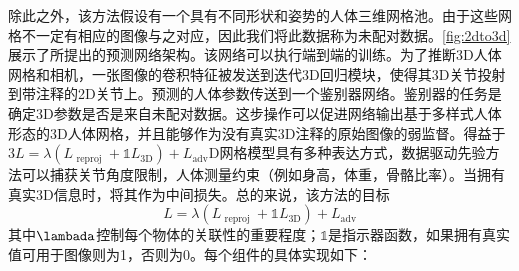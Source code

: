 除此之外，该方法假设有一个具有不同形状和姿势的人体三维网格池。由于这些网格不一定有相应的图像与之对应，因此我们将此数据称为未配对数据。\cref{fig:2dto3d}展示了所提出的预测网络架构。该网络可以执行端到端的训练。为了推断3D人体网格和相机，一张图像的卷积特征被发送到迭代3D回归模块，使得其3D关节投射到带注释的2D关节上。预测的人体参数传送到一个鉴别器网络。鉴别器的任务是确定3D参数是否是来自未配对数据。这步操作可以促进网络输出基于多样式人体形态的3D人体网格，并且能够作为没有真实3D注释的原始图像的弱监督。得益于3$L=\lambda\left(L_{\text { reproj }}+\mathbb{1} L_{3 \mathrm{D}}\right)+L_{\mathrm{adv}}$D网格模型具有多种表达方式，数据驱动先验方法可以捕获关节角度限制，人体测量约束（例如身高，体重，骨骼比率）。当拥有真实3D信息时，将其作为中间损失。总的来说，该方法的目标
\begin{equation}
	L=\lambda\left(L_{\text { reproj }}+\mathbb{1} L_{3 \mathrm{D}}\right)+L_{\mathrm{adv}}
\end{equation}其中$\lambada$控制每个物体的关联性的重要程度；$\mathbb{1}$是指示器函数，如果拥有真实值可用于图像则为1，否则为0。每个组件的具体实现如下：
